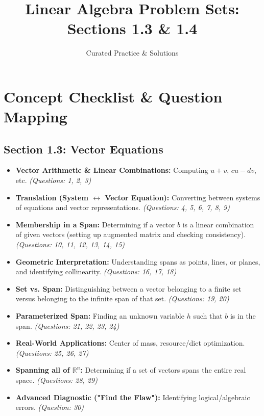 \documentclass[12pt]{article}
\title{Linear Algebra Problem Sets: Sections 1.3 \& 1.4}
\author{Curated Practice \& Solutions}
\date{}
\begin{document}
\maketitle
\tableofcontents
\newpage

\section{Concept Checklist \& Question Mapping}

\subsection{Section 1.3: Vector Equations}
\begin{itemize}
    \item \textbf{Vector Arithmetic \& Linear Combinations:} Computing $u+v$, $cu-dv$, etc. \textit{(Questions: 1, 2, 3)}
    \item \textbf{Translation (System $\leftrightarrow$ Vector Equation):} Converting between systems of equations and vector representations. \textit{(Questions: 4, 5, 6, 7, 8, 9)}
    \item \textbf{Membership in a Span:} Determining if a vector $b$ is a linear combination of given vectors (setting up augmented matrix and checking consistency). \textit{(Questions: 10, 11, 12, 13, 14, 15)}
    \item \textbf{Geometric Interpretation:} Understanding spans as points, lines, or planes, and identifying collinearity. \textit{(Questions: 16, 17, 18)}
    \item \textbf{Set vs. Span:} Distinguishing between a vector belonging to a finite set versus belonging to the infinite span of that set. \textit{(Questions: 19, 20)}
    \item \textbf{Parameterized Span:} Finding an unknown variable $h$ such that $b$ is in the span. \textit{(Questions: 21, 22, 23, 24)}
    \item \textbf{Real-World Applications:} Center of mass, resource/diet optimization. \textit{(Questions: 25, 26, 27)}
    \item \textbf{Spanning all of $\mathbb{R}^n$:} Determining if a set of vectors spans the entire real space. \textit{(Questions: 28, 29)}
    \item \textbf{Advanced Diagnostic ("Find the Flaw"):} Identifying logical/algebraic errors. \textit{(Question: 30)}
\end{itemize}
\end{document}
